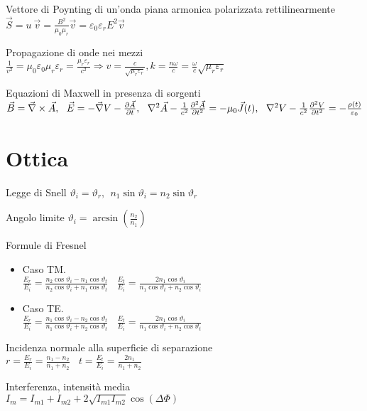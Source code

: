 \documentclass[10pt,a4paper]{article}
\begin{document}
\begin{multicols}{2}
Vettore di Poynting di un'onda piana armonica polarizzata rettilinearmente $\vec{S} =u\ \vec{v} =\frac{B^{2}}{\mu _{0} \mu _{r}}\vec{v} =\varepsilon _{0} \varepsilon _{r} E^{2}\vec{v}$

Propagazione di onde nei mezzi $\frac{1}{v^{2}} =\mu _{0} \varepsilon _{0} \mu _{r} \varepsilon _{r} =\frac{\mu _{r} \varepsilon _{r}}{c^{2}} \Rightarrow v=\frac{c}{\sqrt{\mu _{r} \varepsilon _{r}}} ,k=\frac{n\omega }{c} =\frac{\omega }{c}\sqrt{\mu _{r} \varepsilon _{r}}$

Equazioni di Maxwell in presenza di sorgenti \\$\vec{B} =\vec{\nabla } \times \vec{A} ,\ \ \vec{E} =-\vec{\nabla } V-\frac{\partial \vec{A}}{\partial t} ,\\\ \ \nabla ^{2}\vec{A} -\frac{1}{c^{2}}\frac{\partial ^{2}\vec{A}}{\partial t^{2}} =-\mu _{0}\vec{J} (t),\ \ \nabla ^{2} V-\frac{1}{c^{2}}\frac{\partial ^{2} V}{\partial t^{2}} =-\frac{\rho (t)}{\varepsilon _{0}}$
\section*{Ottica}

Legge di Snell $\vartheta _{i} =\vartheta _{r} ,\ \ n_{1}\sin \vartheta _{i} =n_{2}\sin \vartheta _{r}$

Angolo limite $\vartheta _{i} =\arcsin\left(\frac{n_{2}}{n_{1}}\right)$

Formule di Fresnel
\begin{itemize}
\item Caso TM. \\$\frac{E_{r}}{E_{i}} =\frac{n_{2}\cos \vartheta _{i} -n_{1}\cos \vartheta _{t}}{n_{2}\cos \vartheta _{i} +n_{1}\cos \vartheta _{t}} \ \ \ \ \frac{E_{t}}{E_{i}} =\frac{2n_{1}\cos \vartheta _{i}}{n_{1}\cos \vartheta _{t} +n_{2}\cos \vartheta _{i}}$
\item Caso TE. \\$\frac{E_{r}}{E_{i}} =\frac{n_{1}\cos \vartheta _{i} -n_{2}\cos \vartheta _{t}}{n_{1}\cos \vartheta _{i} +n_{2}\cos \vartheta _{t}} \ \ \ \ \frac{E_{t}}{E_{i}} =\frac{2n_{1}\cos \vartheta _{i}}{n_{1}\cos \vartheta _{i} +n_{2}\cos \vartheta _{t}}$
\end{itemize}

Incidenza normale alla superficie di separazione \\$r=\frac{E_{r}}{E_{i}} =\frac{n_{1} -n_{2}}{n_{1} +n_{2}} \ \ \ \ t=\frac{E_{t}}{E_{i}} =\frac{2n_{1}}{n_{1} +n_{2}}$

Interferenza, intensità media \\$I_{m} =I_{m1} +I_{m2} +2\sqrt{I_{m1} I_{m2}}\cos (\Delta \Phi )$


\end{multicols}
\end{document}
